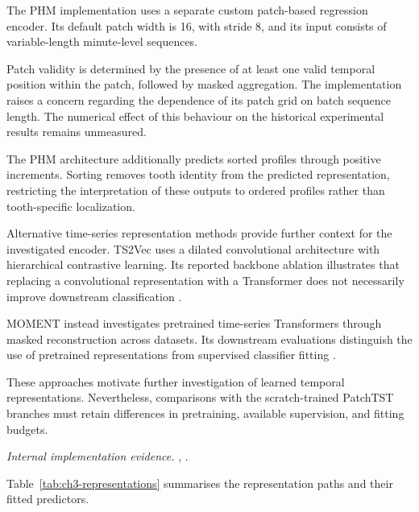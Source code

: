 The PHM implementation uses a separate custom patch-based regression encoder. Its default patch width is 16, with stride 8, and its input consists of variable-length minute-level sequences.

Patch validity is determined by the presence of at least one valid temporal position within the patch, followed by masked aggregation. The implementation raises a concern regarding the dependence of its patch grid on batch sequence length. The numerical effect of this behaviour on the historical experimental results remains unmeasured.

The PHM architecture additionally predicts sorted profiles through positive increments. Sorting removes tooth identity from the predicted representation, restricting the interpretation of these outputs to ordered profiles rather than tooth-specific localization.

Alternative time-series representation methods provide further context for the investigated encoder. TS2Vec uses a dilated convolutional architecture with hierarchical contrastive learning. Its reported backbone ablation illustrates that replacing a convolutional representation with a Transformer does not necessarily improve downstream classification \parencite{P012}.

MOMENT instead investigates pretrained time-series Transformers through masked reconstruction across datasets. Its downstream evaluations distinguish the use of pretrained representations from supervised classifier fitting \parencite{P018}.

These approaches motivate further investigation of learned temporal representations. Nevertheless, comparisons with the scratch-trained PatchTST branches must retain differences in pretraining, available supervision, and fitting budgets.

\noindent\textit{Internal implementation evidence.} , .

Table~\ref{tab:ch3-representations} summarises the representation paths and their fitted predictors.

